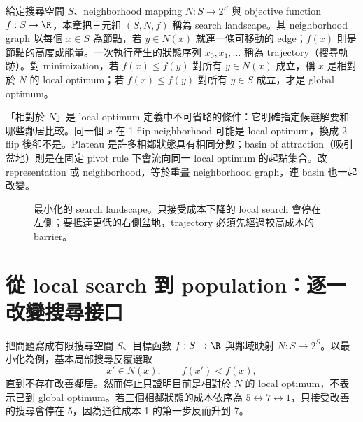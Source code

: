 \documentclass[11pt,a4paper,oneside,openany]{book}
\begin{document}
\begin{definition}
給定搜尋空間 $S$、neighborhood mapping $N:S\to2^S$ 與 objective function $f:S\to\R$，本章把三元組 $(S,N,f)$ 稱為 search landscape。其 neighborhood graph 以每個 $x\in S$ 為節點，若 $y\in N(x)$ 就連一條可移動的 edge；$f(x)$ 則是節點的高度或能量。一次執行產生的狀態序列 $x_0,x_1,\ldots$ 稱為 trajectory（搜尋軌跡）。對 minimization，若 $f(x)\le f(y)$ 對所有 $y\in N(x)$ 成立，稱 $x$ 是相對於 $N$ 的 local optimum；若 $f(x)\le f(y)$ 對所有 $y\in S$ 成立，才是 global optimum。
\end{definition}

「相對於 $N$」是 local optimum 定義中不可省略的條件：它明確指定候選解要和哪些鄰居比較。同一個 $x$ 在 1-flip neighborhood 可能是 local optimum，換成 2-flip 後卻不是。Plateau 是許多相鄰狀態具有相同分數；basin of attraction（吸引盆地）則是在固定 pivot rule 下會流向同一 local optimum 的起點集合。改 representation 或 neighborhood，等於重畫 neighborhood graph，連 basin 也一起改變。

\begin{figure}[htbp]
\centering
{}
\caption{最小化的 search landscape。只接受成本下降的 local search 會停在左側；要抵達更低的右側盆地，trajectory 必須先經過較高成本的 barrier。}
\label{fig:landscape}
\end{figure}

\section{從 local search 到 population：逐一改變搜尋接口}
把問題寫成有限搜尋空間 $S$、目標函數 $f:S\to\R$ 與鄰域映射 $N:S\to 2^S$。以最小化為例，基本局部搜尋反覆選取
\[
 x'\in N(x),\qquad f(x')<f(x),
\]
直到不存在改善鄰居。然而停止只證明目前是相對於 $N$ 的 local optimum，不表示已到 global optimum。若三個相鄰狀態的成本依序為 $5\leftrightarrow7\leftrightarrow1$，只接受改善的搜尋會停在 5，因為通往成本 1 的第一步反而升到 7。
\end{document}
